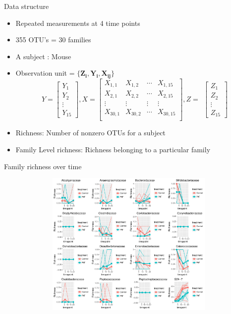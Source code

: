 \documentclass[a4paper,9pt]{beamer}
\begin{document}
\begin{frame}{\huge{Data structure}}
\begin{itemize}
\item Repeated measurements  at 4 time points
\item 355 OTU's = 30 families
\item A subject : Mouse
\item Observation unit = $\{
\bm{Z_i,Y_i,X_{ij}}
\}$
$$ Y = \left[ \begin{array}{c}
Y_1\\
Y_2\\
\vdots\\
Y_{15}
\end{array} \right], X = \left[ \begin{array}{cccc}
X_{1,1} & X_{1,2} & \cdots & X_{1,15} \\
X_{2,1} & X_{2,2} & \cdots & X_{2,15} \\
\vdots & \vdots & \vdots & \vdots \\
X_{30,1} & X_{30,2} & \cdots & X_{30,15} \\
\end{array}
\right], Z =  \ \ \left[ \begin{array}{c}
Z_1\\
Z_2\\
\vdots\\
Z_{15}
\end{array}
\right]$$
\item \alert{Richness:} Number of nonzero OTUs for a subject
\item \alert{Family Level richness:}  Richness belonging to a particular family
\end{itemize}
\end{frame}

\begin{frame}{Family richness over time}
\begin{figure}[H]
\includegraphics[scale=0.35,height=7cm,width=11.5cm]{newg.pdf}
\end{figure}
\end{frame}
\end{document}
